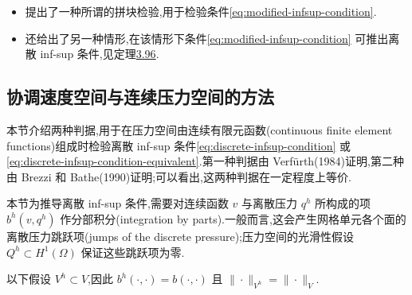 \begin{note}[关于条件(3.90)]\label{note:modified-infsup-condition-comments}
\begin{itemize}
  \item \textcite{BrezziBathe1990} 提出了一种所谓的拼块检验,用于检验条件\cref{eq:modified-infsup-condition}.
\item \textcite{BrezziBathe1990} 还给出了另一种情形,在该情形下条件\cref{eq:modified-infsup-condition} 可推出离散 inf-sup 条件,见定理\hyperref[thm:brezzi-bathe-continuous-pressure]{3.96}.
\end{itemize}
\end{note}

\subsection{协调速度空间与连续压力空间的方法}\label{subsec:conforming-velocity-continuous-pressure}

\begin{note}[内容]\label{note:continuous-pressure-criteria}
本节介绍两种判据,用于在压力空间由连续有限元函数(continuous finite element functions)组成时检验离散 inf-sup 条件\cref{eq:discrete-infsup-condition} 或\cref{eq:discrete-infsup-condition-equivalent}.第一种判据由 Verfürth(1984)证明,第二种由 Brezzi 和 Bathe(1990)证明;可以看出,这两种判据在一定程度上等价.

本节为推导离散 inf-sup 条件,需要对连续函数 $v$ 与离散压力 $q^h$ 所构成的项 $b^h(v,q^h)$ 作分部积分(integration by parts).一般而言,这会产生网格单元各个面的离散压力跳跃项(jumps of the discrete pressure);压力空间的光滑性假设 $Q^h\subset H^1(\Omega)$ 保证这些跳跃项为零.

以下假设 $V^h\subset V$,因此 $b^h(\cdot,\cdot)=b(\cdot,\cdot)$ 且 $\|\cdot\|_{V^h}=\|\cdot\|_V$.
\end{note}

